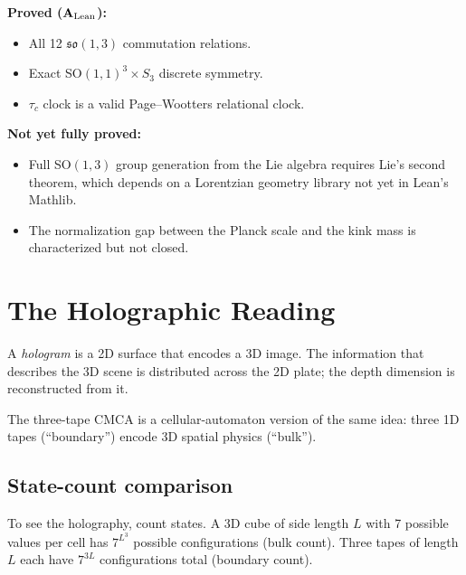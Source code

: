 \documentclass[11pt,a4paper]{article}
\newcommand{\CatAL}{\ensuremath{\mathbf{A}_{\rm Lean}}}
\begin{document}
\begin{tcolorbox}[colback=boxblue,colframe=blue!40!black,
  title=What is and is not proved at the CMCA level]
\textbf{Proved (\CatAL):}\par
\begin{itemize}\setlength\itemsep{2pt}
  \item All 12 $\mathfrak{so}(1,3)$ commutation relations.
  \item Exact SO$(1,1)^3 \times S_3$ discrete symmetry.
  \item $\tau_c$ clock is a valid Page--Wootters relational clock.
\end{itemize}
\textbf{Not yet fully proved:}\par
\begin{itemize}\setlength\itemsep{2pt}
  \item Full SO$(1,3)$ group generation from the Lie algebra requires
        Lie's second theorem, which depends on a Lorentzian geometry
        library not yet in Lean's Mathlib.
  \item The normalization gap between the Planck scale and the kink mass
        is characterized but not closed.
\end{itemize}
\end{tcolorbox}

\section{The Holographic Reading}
\label{sec:holographic}

\begin{tcolorbox}[colback=boxorange,colframe=orange!50!black,title=The holographic analogy]
A \emph{hologram} is a 2D surface that encodes a 3D image.  The information
that describes the 3D scene is distributed across the 2D plate; the
depth dimension is reconstructed from it.

The three-tape CMCA is a cellular-automaton version of the same idea:
three 1D tapes (``boundary'') encode 3D spatial physics (``bulk'').
\end{tcolorbox}

\subsection{State-count comparison}

To see the holography, count states.  A 3D cube of side length $L$ with
7 possible values per cell has $7^{L^3}$ possible configurations (bulk
count).  Three tapes of length $L$ each have $7^{3L}$ configurations total
(boundary count).
\end{document}
